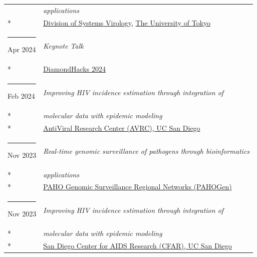 \documentclass[margin,line]{res}
\begin{document}
\begin{resume}
\begin{longtable}{@{}p{0.7in}p{4in}}
\hspace*{-4mm} & \hspace{4mm} \textit{applications}\\*
\hspace*{-4mm} & \hspace{4mm} \href{https://www.ims.u-tokyo.ac.jp/imsut/en/lab/ggclink/section04.html}{Division of Systems Virology}, \href{https://www.u-tokyo.ac.jp/en/}{The University of Tokyo}\\
\hspace*{-4mm} \rule{-1mm}{5mm} Apr 2024 & \textit{Keynote Talk}\\*
\hspace*{-4mm} & \hspace{4mm} \href{https://diamondhacks-2024.devpost.com/}{DiamondHacks 2024}\\
\hspace*{-4mm} \rule{-1mm}{5mm} Feb 2024 & \textit{Improving HIV incidence estimation through integration of}\\*
\hspace*{-4mm} & \hspace{4mm} \textit{molecular data with epidemic modeling}\\*
\hspace*{-4mm} & \hspace{4mm} \href{https://medschool.ucsd.edu/som/medicine/research/centers/avrc/pages/default.aspx}{AntiViral Research Center (AVRC), UC San Diego}\\
\hspace*{-4mm} \rule{-1mm}{5mm} Nov 2023 & \textit{Real-time genomic surveillance of pathogens through bioinformatics}\\*
\hspace*{-4mm} & \hspace{4mm} \textit{applications}\\*
\hspace*{-4mm} & \hspace{4mm} \href{https://www.paho.org/}{PAHO Genomic Surveillance Regional Networks (PAHOGen)}\\
\hspace*{-4mm} \rule{-1mm}{5mm} Nov 2023 & \textit{Improving HIV incidence estimation through integration of}\\*
\hspace*{-4mm} & \hspace{4mm} \textit{molecular data with epidemic modeling}\\*
\hspace*{-4mm} & \hspace{4mm} \href{https://cfar.ucsd.edu/}{San Diego Center for AIDS Research (CFAR), UC San Diego}\\

\end{longtable}
\end{resume}
\end{document}
